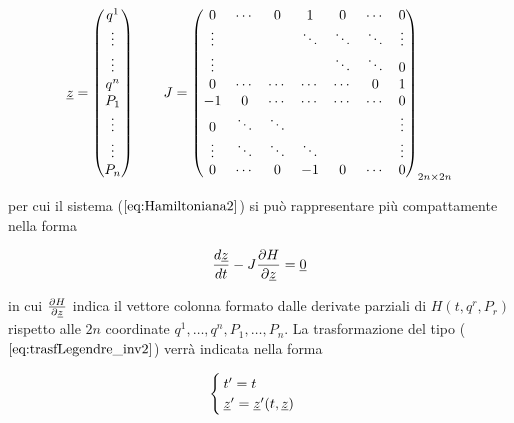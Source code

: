\begin{equation}
  \uline{z} =
  \begin{pmatrix}
    q^1 \\ \vdots \\ \vdots \\ q^n \\ P_1 \\ \vdots \\ \vdots \\ P_n
  \end{pmatrix} \qquad
  J =
  \begin{pmatrix}
    0      & \cdots & 0      & 1      & 0      & \cdots & 0 \\
    \vdots &        &        & \ddots & \ddots & \ddots & \vdots \\
    \vdots &        &        &        & \ddots & \ddots & 0 \\
    0      & \cdots & \cdots & \cdots & \cdots & 0      & 1 \\
    -1     & 0      & \cdots & \cdots & \cdots & \cdots & 0\\
    0      & \ddots & \ddots &        &        &        & \vdots \\
    \vdots & \ddots & \ddots & \ddots &        &        & \vdots \\
    0      & \cdots & 0      & -1     & 0      & \cdots & 0 \\
  \end{pmatrix}_{2n\times2n}
\end{equation}

per cui il sistema ($\ref{eq:Hamiltoniana2}$) si può rappresentare più compattamente nella forma

\begin{equation} \label{eq:Hamiltoniana_vett2}
  \frac{d \uline{z}}{d t} - J \frac{\partial H}{\partial \uline{z}} = \uline{0}
\end{equation}

in cui $ \frac{\partial H}{\partial \uline{z}} $ indica il vettore colonna formato dalle derivate parziali di $ H(t, q^r, P_r) $ rispetto alle $ 2n $ coordinate $ q^1, \dots, q^n,P_1, \dots, P_n $.
La trasformazione del tipo ($ \ref{eq:trasfLegendre_inv2} $) verrà indicata nella forma

\begin{equation} \label{eq:trasfLegendre_inv_vett2}
  \begin{cases}
    t' = t \\ \uline{z}' = \uline{z}'(t, \uline{z})
  \end{cases}
\end{equation}

